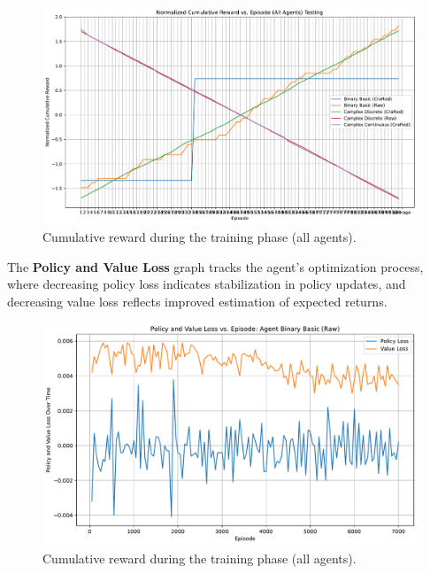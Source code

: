\documentclass[sigconf]{acmart}
\begin{document}
\bigskip

\begin{figure}[t]
  \centering
  \includegraphics[width=\textwidth]{cumulative_reward_all_testing.pdf}
  \caption{Cumulative reward during the training phase (all agents).}
  \label{fig:cumulative_reward_all_testing}
\end{figure}

The \textbf{Policy and Value Loss} graph tracks the agent's optimization process, where decreasing policy loss indicates stabilization in policy updates, and decreasing value loss reflects improved estimation of expected returns. 

\begin{figure}[t]
  \centering
  \includegraphics[width=\textwidth]{policy_value_loss_Binary Basic (Raw).pdf}
  \caption{Cumulative reward during the training phase (all agents).}
  \label{fig:policy_value_loss_Binary Basic (Raw)}
\end{figure}
\end{document}
